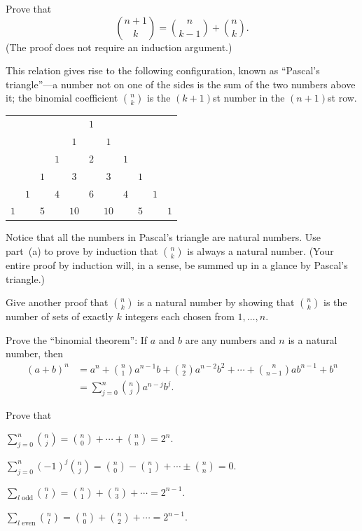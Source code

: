 \begin{letters}
\item Prove that
\[ \binom{n+1}{k} = \binom{n}{k-1} + \binom{n}{k}. \]
(The proof does not require an induction argument.)

This relation gives rise to the following configuration, known as
``Pascal's triangle''---a number not on one of the sides is the sum of the
two numbers above it; the binomial coefficient $\binom{n}{k}$ is the
$(k+1)$st number in the $(n+1)$st row.
\begin{center}
\begin{tabular}{ccccccccccc}
&&&&& $1$\\
&&&& $1$ && $1$\\
&&& $1$ && $2$ && $1$\\
&& $1$ && $3$ && $3$ && $1$\\
& $1$ && $4$ && $6$ && $4$ && $1$\\
$1$ && $5$ && $10$ && $10$ && $5$ && $1$
\end{tabular}
\end{center}

\item Notice that all the numbers in Pascal's triangle are natural numbers.
  Use part~(a) to prove by induction that $\binom{n}{k}$ is always a natural
  number. (Your entire proof by induction will, in a sense, be summed up in a
  glance by Pascal's triangle.)
\item Give another proof that $\binom{n}{k}$ is a natural number by showing
  that $\binom{n}{k}$ is the number of sets of exactly $k$ integers each
  chosen from $1, \dots, n$.
\item Prove the ``binomial theorem'': If $a$ and $b$ are any numbers and $n$
  is a natural number, then
\begin{align*}
(a+b)^n
  &= a^n + \binom{n}{1} a^{n-1} b + \binom{n}{2} a^{n-2} b^2 + \cdots
     + \binom{n}{n-1} a b^{n-1} + b^n \\
  &= \sum_{j=0}^{n} \binom{n}{j} a^{n-j} b^j.
\end{align*}
\item Prove that
\begin{romans}
\item $\displaystyle\sum_{j=0}^{n} \binom{n}{j}
      = \binom{n}{0} + \cdots + \binom{n}{n} = 2^n$.
\item $\displaystyle\sum_{j=0}^{n} (-1)^j \binom{n}{j}
      = \binom{n}{0} - \binom{n}{1} + \cdots \pm \binom{n}{n} = 0$.
\item $\displaystyle\sum_{l \text{ odd}} \binom{n}{l}
      = \binom{n}{1} + \binom{n}{3} + \cdots = 2^{n-1}$.
\item $\displaystyle\sum_{l \text{ even}} \binom{n}{l}
      = \binom{n}{0} + \binom{n}{2} + \cdots = 2^{n-1}$.
\end{romans}
\end{letters}

